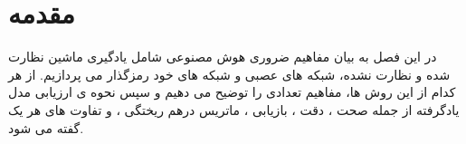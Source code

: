 \section{مقدمه}


در این فصل به بیان مفاهیم ضروری هوش مصنوعی شامل یادگیری ماشین نظارت شده و نظارت نشده، شبکه های عصبی و شبکه های خود رمزگذار می پردازیم. از هر کدام از این روش ها، مفاهیم تعدادی را توضیح می دهیم و
سپس نحوه ی ارزیابی مدل یادگرفته از جمله صحت
،
دقت
،
بازیابی
،
ماتریس درهم ریختگی
،
و تفاوت های هر یک گفته می شود.

